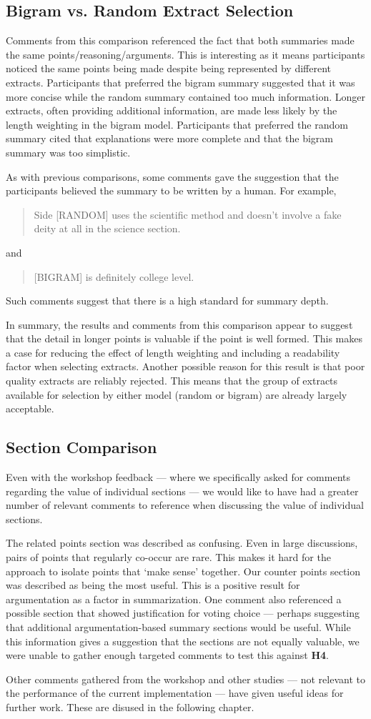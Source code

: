     \tocless\subsection{Bigram vs. Random Extract Selection}
      Comments from this comparison referenced the fact that both summaries made the same points/reasoning/arguments. This is interesting as it means participants noticed the same points being made despite being represented by different extracts. Participants that preferred the bigram summary suggested that it was more concise while the random summary contained too much information. Longer extracts, often providing additional information, are made less likely by the length weighting in the bigram model. Participants that preferred the random summary cited that explanations were more complete and that the bigram summary was too simplistic.

      As with previous comparisons, some comments gave the suggestion that the participants believed the summary to be written by a human. For example, \blockquote{Side [RANDOM] uses the scientific method and doesn't involve a fake deity at all in the science section.} and \blockquote{[BIGRAM] is definitely college level.}. Such comments suggest that there is a high standard for summary depth.

      In summary, the results and comments from this comparison appear to suggest that the detail in longer points is valuable if the point is well formed. This makes a case for reducing the effect of length weighting and including a readability factor when selecting extracts. Another possible reason for this result is that poor quality extracts are reliably rejected. This means that the group of extracts available for selection by either model (random or bigram) are already largely acceptable.

    \tocless\subsection{Section Comparison}
      Even with the workshop feedback --- where we specifically asked for comments regarding the value of individual sections --- we would like to have had a greater number of relevant comments to reference when discussing the value of individual sections.

			The related points section was described as confusing. Even in large discussions, pairs of points that regularly co-occur are rare. This makes it hard for the approach to isolate points that `make sense' together. Our counter points section was described as being the most useful. This is a positive result for argumentation as a factor in summarization. One comment also referenced a possible section that showed justification for voting choice --- perhaps suggesting that additional argumentation-based summary sections would be useful. While this information gives a suggestion that the sections are not equally valuable, we were unable to gather enough targeted comments to test this against \textbf{H4}.

      Other comments gathered from the workshop and other studies --- not relevant to the performance of the current implementation --- have given useful ideas for further work. These are disused in the following chapter.

